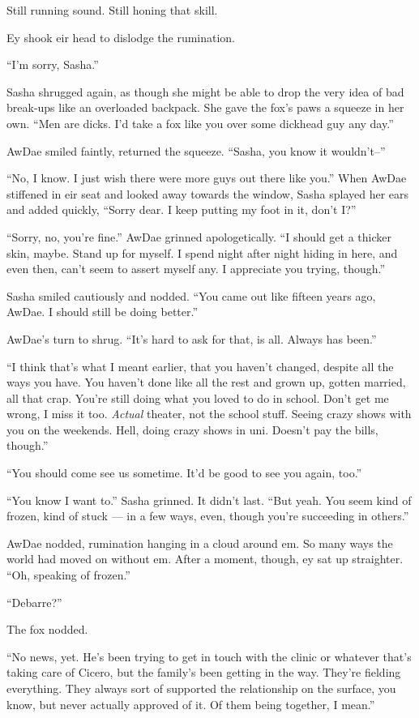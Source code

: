 Still running sound. Still honing that skill.

Ey shook eir head to dislodge the rumination.

``I'm sorry, Sasha.''

Sasha shrugged again, as though she might be able to drop the very idea of bad break-ups like an overloaded backpack. She gave the fox's paws a squeeze in her own. ``Men are dicks. I'd take a fox like you over some dickhead guy any day.''

AwDae smiled faintly, returned the squeeze. ``Sasha, you know it wouldn't--''

``No, I know. I just wish there were more guys out there like you.'' When AwDae stiffened in eir seat and looked away towards the window, Sasha splayed her ears and added quickly, ``Sorry dear. I keep putting my foot in it, don't I?''

``Sorry, no, you're fine.'' AwDae grinned apologetically. ``I should get a thicker skin, maybe. Stand up for myself. I spend night after night hiding in here, and even then, can't seem to assert myself any. I appreciate you trying, though.''

Sasha smiled cautiously and nodded. ``You came out like fifteen years ago, AwDae. I should still be doing better.''

AwDae's turn to shrug. ``It's hard to ask for that, is all. Always has been.''

``I think that's what I meant earlier, that you haven't changed, despite all the ways you have. You haven't done like all the rest and grown up, gotten married, all that crap. You're still doing what you loved to do in school. Don't get me wrong, I miss it too. \emph{Actual} theater, not the school stuff. Seeing crazy shows with you on the weekends. Hell, doing crazy shows in uni. Doesn't pay the bills, though.''

``You should come see us sometime. It'd be good to see you again, too.''

``You know I want to.'' Sasha grinned. It didn't last. ``But yeah. You seem kind of frozen, kind of stuck — in a few ways, even, though you're succeeding in others.''

AwDae nodded, rumination hanging in a cloud around em. So many ways the world had moved on without em. After a moment, though, ey sat up straighter. ``Oh, speaking of frozen.''

``Debarre?''

The fox nodded.

``No news, yet. He's been trying to get in touch with the clinic or whatever that's taking care of Cicero, but the family's been getting in the way. They're fielding everything. They always sort of supported the relationship on the surface, you know, but never actually approved of it. Of them being together, I mean.''

